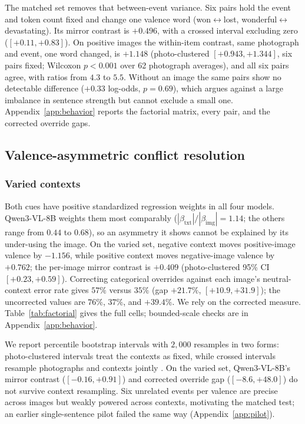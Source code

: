 \documentclass{article}
\newcommand{\qwen}{Qwen3-VL-8B}
\newcommand{\betaimg}{\beta_{\text{img}}}
\newcommand{\betatxt}{\beta_{\text{txt}}}
\begin{document}
The matched set removes that between-event variance. Six pairs hold the event and token count fixed and change one valence word (won$\leftrightarrow$lost, wonderful$\leftrightarrow$devastating). Its mirror contrast is $+0.496$, with a crossed interval excluding zero ($[+0.11,+0.83]$). On positive images the within-item contrast, same photograph and event, one word changed, is $+1.148$ (photo-clustered $[+0.943,+1.344]$, six pairs fixed; Wilcoxon $p<0.001$ over 62 photograph averages), and all six pairs agree, with ratios from $4.3$ to $5.5$. Without an image the same pairs show no detectable difference ($+0.33$ log-odds, $p=0.69$), which argues against a large imbalance in sentence strength but cannot exclude a small one. Appendix~\ref{app:behavior} reports the factorial matrix, every pair, and the corrected override gaps.


\else
\subsection{Valence-asymmetric conflict resolution}
\label{sec:conflict}

\subsubsection{Varied contexts}
\label{sec:integration}
\label{sec:asymmetry}

Both cues have positive standardized regression weights in all four models. \qwen{} weights them most comparably ($|\betatxt|/|\betaimg|=1.14$; the others range from $0.44$ to $0.68$), so an asymmetry it shows cannot be explained by its under-using the image. On the varied set, negative context moves positive-image valence by $-1.156$, while positive context moves negative-image valence by $+0.762$; the per-image mirror contrast is $+0.409$ (photo-clustered 95\% CI $[+0.23,+0.59]$). Correcting categorical overrides against each image's neutral-context error rate gives $57\%$ versus $35\%$ (gap $+21.7\%$, $[+10.9,+31.9]$); the uncorrected values are $76\%$, $37\%$, and $+39.4\%$. We rely on the corrected measure. Table~\ref{tab:factorial} gives the full cells; bounded-scale checks are in Appendix~\ref{app:behavior}.

We report percentile bootstrap intervals with $2{,}000$ resamples in two forms: photo-clustered intervals treat the contexts as fixed, while crossed intervals resample photographs and contexts jointly \citep{clark1973, baayen2008}. On the varied set, \qwen{}'s mirror contrast ($[-0.16,+0.91]$) and corrected override gap ($[-8.6,+48.0]$) do not survive context resampling. Six unrelated events per valence are precise across images but weakly powered across contexts, motivating the matched test; an earlier single-sentence pilot failed the same way (Appendix~\ref{app:pilot}).
\end{document}
